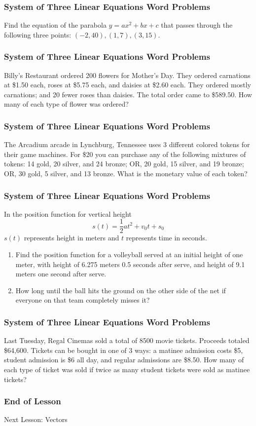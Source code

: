 \documentclass[xcolor=dvipsnames]{beamer}
\begin{document}
\begin{frame}
  \frametitle{System of Three Linear Equations Word Problems}
  {\ubung} Find the equation of the parabola $y=ax^{2}+bx+c$ that
  passes through the following three points: $(-2,40),(1,7),(3,15)$.
\end{frame}

\begin{frame}
  \frametitle{System of Three Linear Equations Word Problems}
  {\ubung} Billy's Restaurant ordered 200 flowers for Mother's Day.
  They ordered carnations at \$1.50 each, roses at \$5.75 each, and
  daisies at \$2.60 each. They ordered mostly carnations; and 20 fewer
  roses than daisies. The total order came to \$589.50. How many of
  each type of flower was ordered?
\end{frame}

\begin{frame}
  \frametitle{System of Three Linear Equations Word Problems}
  {\ubung} The Arcadium arcade in Lynchburg, Tennessee uses 3
  different colored tokens for their game machines. For \$20 you can
  purchase any of the following mixtures of tokens: 14 gold, 20
  silver, and 24 bronze; OR, 20 gold, 15 silver, and 19 bronze; OR, 30
  gold, 5 silver, and 13 bronze. What is the monetary value of each
  token?
\end{frame}

\begin{frame}
  \frametitle{System of Three Linear Equations Word Problems}
  {\ubung} In the position function for vertical height
  \begin{equation}
    \label{eq:eicheuth}
    s(t)=\frac{1}{2}at^{2}+v_{0}t+s_{0}
  \end{equation}
  $s(t)$ represents height in meters and $t$ represents time in
  seconds.
  \begin{enumerate}
  \item Find the position function for a volleyball served at an
    initial height of one meter, with height of 6.275 meters 0.5
    seconds after serve, and height of 9.1 meters one second after
    serve.
  \item How long until the ball hits the ground on the other side of
    the net if everyone on that team completely misses it?
  \end{enumerate}
\end{frame}

\begin{frame}
  \frametitle{System of Three Linear Equations Word Problems}
  {\ubung} Last Tuesday, Regal Cinemas sold a total of 8500 movie
  tickets. Proceeds totaled \$64,600. Tickets can be bought in one of
  3 ways: a matinee admission costs \$5, student admission is \$6 all
  day, and regular admissions are \$8.50. How many of each type of
  ticket was sold if twice as many student tickets were sold as
  matinee tickets?
\end{frame}

\begin{frame}
  \frametitle{End of Lesson}
Next Lesson: Vectors
\end{frame}
\end{document}

